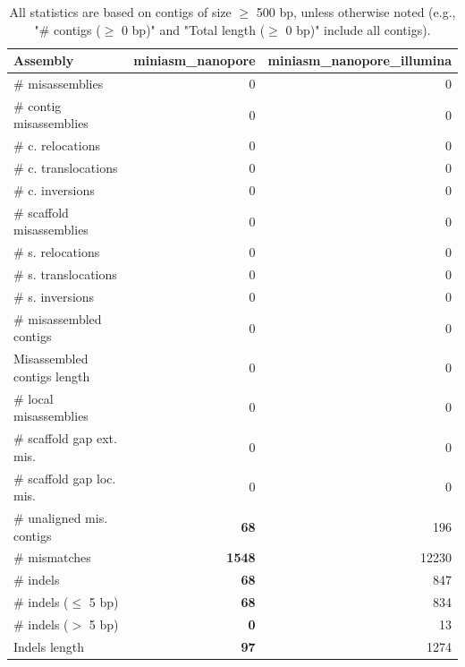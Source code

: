 \documentclass[12pt,a4paper]{article}
\begin{document}
\begin{table}[ht]
\begin{center}
\caption{All statistics are based on contigs of size $\geq$ 500 bp, unless otherwise noted (e.g., "\# contigs ($\geq$ 0 bp)" and "Total length ($\geq$ 0 bp)" include all contigs).}
\begin{tabular}{|l*{2}{|r}|}
\hline
Assembly & miniasm\_nanopore & miniasm\_nanopore\_illumina \\ \hline
\# misassemblies & 0 & 0 \\ \hline
\hspace{2mm}\# contig misassemblies & 0 & 0 \\ \hline
\hspace{5mm}\# c. relocations & 0 & 0 \\ \hline
\hspace{5mm}\# c. translocations & 0 & 0 \\ \hline
\hspace{5mm}\# c. inversions & 0 & 0 \\ \hline
\hspace{2mm}\# scaffold misassemblies & 0 & 0 \\ \hline
\hspace{5mm}\# s. relocations & 0 & 0 \\ \hline
\hspace{5mm}\# s. translocations & 0 & 0 \\ \hline
\hspace{5mm}\# s. inversions & 0 & 0 \\ \hline
\# misassembled contigs & 0 & 0 \\ \hline
Misassembled contigs length & 0 & 0 \\ \hline
\# local misassemblies & 0 & 0 \\ \hline
\# scaffold gap ext. mis. & 0 & 0 \\ \hline
\# scaffold gap loc. mis. & 0 & 0 \\ \hline
\# unaligned mis. contigs & {\bf 68} & 196 \\ \hline
\# mismatches & {\bf 1548} & 12230 \\ \hline
\# indels & {\bf 68} & 847 \\ \hline
\hspace{5mm}\# indels ($\leq$ 5 bp) & {\bf 68} & 834 \\ \hline
\hspace{5mm}\# indels ($>$ 5 bp) & {\bf 0} & 13 \\ \hline
Indels length & {\bf 97} & 1274 \\ \hline
\end{tabular}
\end{center}
\end{table}
\end{document}
